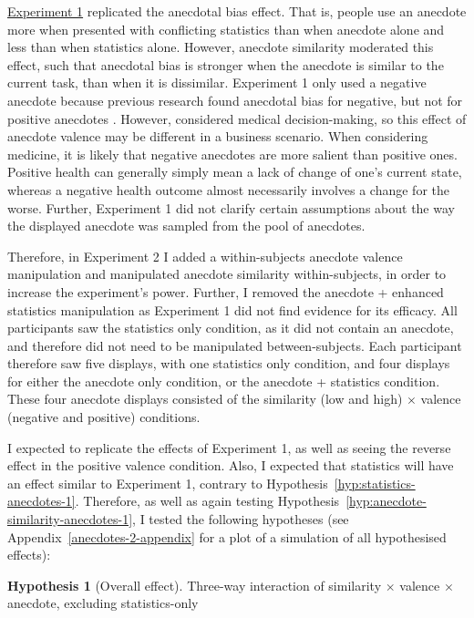 \documentclass[a4paper, nobind, dvipsnames]{templates/ociamthesis}
\theoremstyle{definition}
\theoremstyle{definition}
\theoremstyle{definition}
\theoremstyle{definition}
\newtheorem{hypothesis}{Hypothesis}[chapter]
\theoremstyle{remark}
\begin{document}
\protect\hyperlink{anecdotes-1}{Experiment 1} replicated the anecdotal bias effect. That is,
people use an anecdote more when presented with conflicting statistics than when
anecdote alone and less than when statistics alone. However, anecdote similarity
moderated this effect, such that anecdotal bias is stronger when the anecdote is
similar to the current task, than when it is dissimilar. Experiment 1 only used
a negative anecdote because previous research found anecdotal bias for negative,
but not for positive anecdotes \autocite{jaramillo2019}. However, \textcite{jaramillo2019}
considered medical decision-making, so this effect of anecdote valence may be
different in a business scenario. When considering medicine, it is likely that
negative anecdotes are more salient than positive ones. Positive health can
generally simply mean a lack of change of one's current state, whereas a
negative health outcome almost necessarily involves a change for the worse.
Further, Experiment 1 did not clarify certain assumptions about the way the
displayed anecdote was sampled from the pool of anecdotes.

Therefore, in Experiment 2 I added a within-subjects anecdote valence
manipulation and manipulated anecdote similarity within-subjects, in order to
increase the experiment's power. Further, I removed the anecdote + enhanced
statistics manipulation as Experiment 1 did not find evidence for its efficacy.
All participants saw the statistics only condition, as it did not contain an
anecdote, and therefore did not need to be manipulated between-subjects. Each
participant therefore saw five displays, with one statistics only condition, and
four displays for either the anecdote only condition, or the anecdote +
statistics condition. These four anecdote displays consisted of the similarity
(low and high) \(\times\) valence (negative and positive) conditions.

I expected to replicate the effects of Experiment 1, as well as seeing the
reverse effect in the positive valence condition. Also, I expected that
statistics will have an effect similar to Experiment 1, contrary to
Hypothesis~\ref{hyp:statistics-anecdotes-1}. Therefore, as well as again
testing Hypothesis~\ref{hyp:anecdote-similarity-anecdotes-1}, I tested the
following hypotheses (see Appendix~\ref{anecdotes-2-appendix} for a plot of a
simulation of all hypothesised effects):

\begin{hypothesis}[Overall effect]
\protect\hypertarget{hyp:three-way-anecdotes-2}{}{\label{hyp:three-way-anecdotes-2} {} }Three-way interaction of similarity \(\times\) valence \(\times\) anecdote,
excluding statistics-only
\end{hypothesis}
\end{document}
